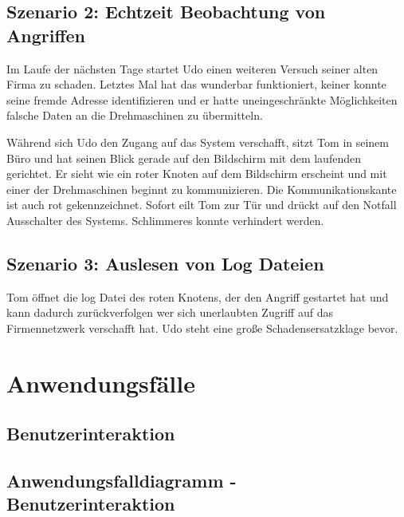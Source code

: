 \subsection{Szenario 2: Echtzeit Beobachtung von Angriffen}

Im Laufe der nächsten Tage startet Udo einen weiteren Versuch seiner alten Firma zu schaden. Letztes Mal hat das wunderbar funktioniert, keiner konnte seine fremde Adresse identifizieren und er hatte uneingeschränkte Möglichkeiten falsche Daten an die Drehmaschinen zu übermitteln.

Während sich Udo den Zugang auf das System verschafft, sitzt Tom in seinem Büro und hat seinen Blick gerade auf den Bildschirm mit dem laufenden \programname gerichtet. Er sieht wie ein roter Knoten auf dem Bildschirm erscheint und mit einer der Drehmaschinen beginnt zu kommunizieren. Die Kommunikationskante ist auch rot gekennzeichnet. Sofort eilt Tom zur Tür und drückt auf den Notfall Ausschalter des Systems. Schlimmeres konnte verhindert werden.

\subsection{Szenario 3: Auslesen von Log Dateien}

Tom öffnet die log Datei des roten Knotens, der den Angriff gestartet hat und kann dadurch zurückverfolgen wer sich unerlaubten Zugriff auf das Firmennetzwerk verschafft hat. Udo steht eine große Schadensersatzklage bevor.


\section{Anwendungsfälle}

\subsection{Benutzerinteraktion}


\subsection*{Anwendungsfalldiagramm - Benutzerinteraktion}


